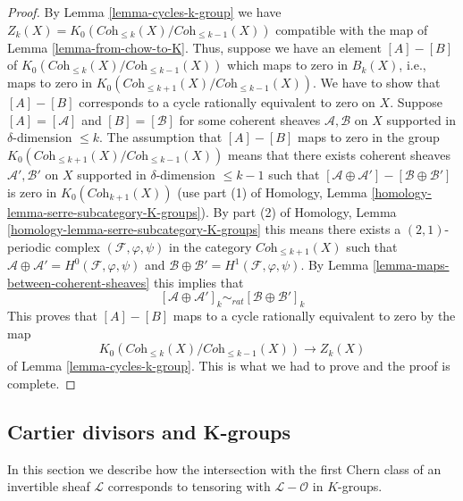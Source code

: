 \begin{proof}
By Lemma \ref{lemma-cycles-k-group} we have
$Z_k(X) = K_0(\textit{Coh}_{\leq k}(X)/\textit{Coh}_{\leq k - 1}(X))$
compatible with the map of Lemma \ref{lemma-from-chow-to-K}.
Thus, suppose we have an element $[A] - [B]$ of
$K_0(\textit{Coh}_{\leq k}(X)/\textit{Coh}_{\leq k - 1}(X))$
which maps to zero in $B_k(X)$, i.e., maps to zero in
$K_0(\textit{Coh}_{\leq k + 1}(X)/\textit{Coh}_{\leq k - 1}(X))$.
We have to show that $[A] - [B]$ corresponds to a cycle
rationally equivalent to zero on $X$.
Suppose $[A] = [\mathcal{A}]$ and $[B] = [\mathcal{B}]$
for some coherent sheaves $\mathcal{A}, \mathcal{B}$ on
$X$ supported in $\delta$-dimension $\leq k$.
The assumption that $[A] - [B]$ maps to zero in the group
$K_0(\textit{Coh}_{\leq k + 1}(X)/\textit{Coh}_{\leq k - 1}(X))$
means that there exists coherent sheaves
$\mathcal{A}', \mathcal{B}'$ on $X$ supported in
$\delta$-dimension $\leq k - 1$ such that
$[\mathcal{A} \oplus \mathcal{A}'] - [\mathcal{B} \oplus \mathcal{B}']$
is zero in $K_0(\textit{Coh}_{k + 1}(X))$ (use part (1) of
Homology, Lemma \ref{homology-lemma-serre-subcategory-K-groups}).
By part (2) of
Homology, Lemma \ref{homology-lemma-serre-subcategory-K-groups}
this means there exists a $(2, 1)$-periodic complex
$(\mathcal{F}, \varphi, \psi)$ in the category $\textit{Coh}_{\leq k + 1}(X)$
such that
$\mathcal{A} \oplus \mathcal{A}' = H^0(\mathcal{F}, \varphi, \psi)$
and $\mathcal{B} \oplus \mathcal{B}' = H^1(\mathcal{F}, \varphi, \psi)$.
By Lemma \ref{lemma-maps-between-coherent-sheaves}
this implies that
$$
[\mathcal{A} \oplus \mathcal{A}']_k
\sim_{rat}
[\mathcal{B} \oplus \mathcal{B}']_k
$$
This proves that $[A] - [B]$ maps to a cycle rationally
equivalent to zero by the map
$$
K_0(\textit{Coh}_{\leq k}(X)/\textit{Coh}_{\leq k - 1}(X))
\longrightarrow Z_k(X)
$$
of Lemma \ref{lemma-cycles-k-group}. This is what we
had to prove and the proof is complete.
\end{proof}














\subsection{Cartier divisors and K-groups}
\label{subsection-cartier-coherent}

\noindent
In this section we describe how the intersection with the
first Chern class of an invertible sheaf $\mathcal{L}$
corresponds to tensoring with $\mathcal{L} - \mathcal{O}$
in $K$-groups.

